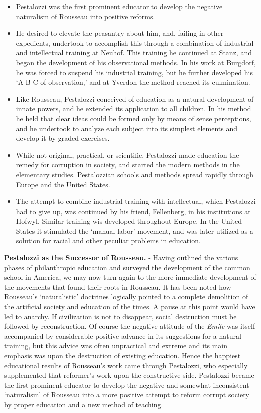 \documentclass[]{book}
\providecommand{\tightlist}{%
  \setlength{\itemsep}{0pt}\setlength{\parskip}{0pt}}
\begin{document}
\begin{itemize}
\tightlist
\item
  Pestalozzi was the first prominent educator to develop the negative naturalism of Rousseau into positive reforms.
\item
  He desired to elevate the peasantry about him, and, failing in other expedients, undertook to accomplish this through a combination of industrial and intellectual training at Neuhof. This training he continued at Stanz, and began the development of his observational methods. In his work at Burgdorf, he was forced to suspend his industrial training, but he further developed his `A B C of observation,' and at Yverdon the method reached its culmination.
\item
  Like Rousseau, Pestalozzi conceived of education as a natural development of innate powers, and he extended its application to all children. In his method he held that clear ideas could be formed only by means of sense perceptions, and he undertook to analyze each subject into its simplest elements and develop it by graded exercises.
\item
  While not original, practical, or scientific, Pestalozzi made education the remedy for corruption in society, and started the modern methods in the elementary studies. Pestalozzian schools and methods spread rapidly through Europe and the United States.
\item
  The attempt to combine industrial training with intellectual, which Pestalozzi had to give up, was continued by his friend, Fellenberg, in his institutions at Hofwyl. Similar training wis developed throughout Europe. In the United States it stimulated the `manual labor' movement, and was later utilized as a solution for racial and other peculiar problems in education.
\end{itemize}

\textbf{Pestalozzi as the Successor of Rousseau.} - Having outlined the various phases of philanthropic education and surveyed the development of the common school in America, we may now turn again to the more immediate development of the movements that found their roots in Rousseau. It has been noted how Rousseau's `naturalistic' doctrines logically pointed to a complete demolition of the artificial society and education of the times. A pause at this point would have led to anarchy. If civilization is not to disappear, social destruction must be followed by reconstruction. Of course the negative attitude of the \emph{Emile} was itself accompanied by considerable positive advance in its suggestions for a natural training, but this advice was often unpractical and extreme and its main emphasis was upon the destruction of existing education. Hence the happiest educational results of Rousseau's work came through Pestalozzi, who especially supplemented that reformer's work upon the constructive side. Pestalozzi became the first prominent educator to develop the negative and somewhat inconsistent `naturalism' of Rousseau into a more positive attempt to reform corrupt society by proper education and a new method of teaching.
\end{document}
